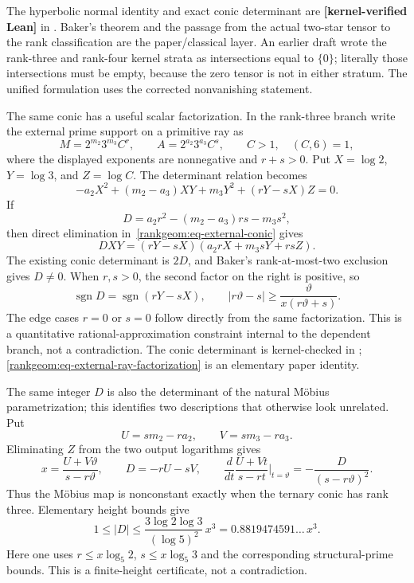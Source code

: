 \documentclass[11pt,oneside]{article}
\theoremstyle{definition}
\theoremstyle{remark}
\newcommand{\thetaq}{\vartheta}
\newcommand{\lean}[1]{\texttt{\detokenize{#1}}}
\newcommand{\statuslean}{\textcolor{leanblue}{\textbf{[kernel-verified Lean]}}}
\begin{document}
The hyperbolic normal identity and exact conic determinant are \statuslean{} in
\lean{RankGeometry}.  Baker's theorem and the passage from the actual two-star tensor
to the rank classification are the paper/classical layer.  An earlier draft wrote the
rank-three and rank-four kernel strata as intersections equal to $\{0\}$; literally those
intersections must be empty, because the zero tensor is not in either stratum.  The unified
formulation uses the corrected nonvanishing statement.

The same conic has a useful scalar factorization.  In the rank-three branch write the
external prime support on a primitive ray as
\[
 M=2^{m_2}3^{m_3}C^r,
 \qquad
 A=2^{a_2}3^{a_3}C^s,
 \qquad C>1,\quad (C,6)=1,
\]
where the displayed exponents are nonnegative and $r+s>0$.  Put
$X=\log2$, $Y=\log3$, and $Z=\log C$.  The determinant relation becomes
\begin{equation}
 -a_2X^2+(m_2-a_3)XY+m_3Y^2+(rY-sX)Z=0.
 \label{rankgeom:eq-external-conic}
\end{equation}
If
\[
 D=a_2r^2-(m_2-a_3)rs-m_3s^2,
\]
then direct elimination in~\eqref{rankgeom:eq-external-conic} gives
\begin{equation}
 \boxed{DXY=(rY-sX)(a_2rX+m_3sY+rsZ).}
 \label{rankgeom:eq-external-ray-factorization}
\end{equation}
The existing conic determinant is $2D$, and Baker's rank-at-most-two exclusion gives
$D\ne0$.  When $r,s>0$, the second factor on the right is positive, so
\begin{equation}
 \operatorname{sgn}D=\operatorname{sgn}(rY-sX),
 \qquad
 |r\thetaq-s|\ge
 \frac{\thetaq}{x(r\thetaq+s)}.
 \label{rankgeom:eq-external-ray-bound}
\end{equation}
The edge cases $r=0$ or $s=0$ follow directly from the same factorization.  This is a
quantitative rational-approximation constraint internal to the dependent branch, not a
contradiction.  The conic determinant is kernel-checked in \lean{RankGeometry};
\eqref{rankgeom:eq-external-ray-factorization} is an elementary paper identity.

The same integer $D$ is also the determinant of the natural M\"obius parametrization; this
identifies two descriptions that otherwise look unrelated.  Put
\begin{equation}
 U=sm_2-ra_2,\qquad V=sm_3-ra_3.
 \label{rankgeom:eq-mobius-uv}
\end{equation}
Eliminating $Z$ from the two output logarithms gives
\begin{equation}
 x=\frac{U+V\thetaq}{s-r\thetaq},\qquad
 D=-rU-sV,\qquad
 \frac{d}{dt}\frac{U+Vt}{s-rt}\bigg|_{t=\thetaq}
 =-\frac{D}{(s-r\thetaq)^2}.
 \label{rankgeom:eq-mobius-determinant}
\end{equation}
Thus the M\"obius map is nonconstant exactly when the ternary conic has rank three.
Elementary height bounds give
\begin{equation}
 1\le|D|\le
 \frac{3\log2\log3}{(\log5)^2}\,x^3
 =0.8819474591\ldots\,x^3.
 \label{rankgeom:eq-mobius-height}
\end{equation}
Here one uses $r\le x\log_5 2$, $s\le x\log_5 3$ and the corresponding
structural-prime bounds.  This is a finite-height certificate, not a contradiction.
\end{document}

